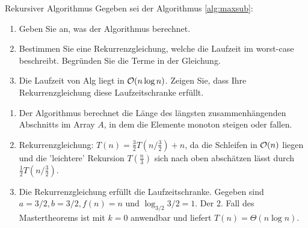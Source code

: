 \documentclass{article}
\begin{document}
\begin{exercise}{Rekursiver Algorithmus}
  Gegeben sei der Algorithmus \ref{alg:maxsub}:
  
  \begin{enumerate}
    \item Geben Sie an, was der Algorithmus berechnet.
    \item Bestimmen Sie eine Rekurrenzgleichung, welche die Laufzeit im worst-case beschreibt. Begründen Sie die Terme in der Gleichung.
    \item Die Laufzeit von Alg liegt in $\mathcal{O}(n \log n)$. Zeigen Sie, dass Ihre Rekurrenzgleichung diese Laufzeitschranke erfüllt.
  \end{enumerate}

  \begin{solution}
    \begin{enumerate}
      \item Der Algorithmus berechnet die Länge des längsten zusammenhängenden Abschnitts im Array $A$, in dem die Elemente monoton steigen oder fallen.
      \item Rekurrenzgleichung: $T(n) = \frac{3}{2}T(n/\frac{3}{2}) + n$, da die Schleifen in $\mathcal{O}(n)$ liegen und die 'leichtere' Rekursion $T(\frac{n}{3})$ sich nach oben abschätzen lässt durch $\frac{1}{2}T(n/\frac{3}{2})$.
      \item Die Rekurrenzgleichung erfüllt die Laufzeitschranke. Gegeben sind $a=3/2, b=3/2, f(n)=n$ und $\log_{3/2}{3/2} = 1$. Der 2. Fall des Mastertheorems ist mit $k=0$ anwendbar und liefert $T(n) = \Theta(n \log n)$.
    \end{enumerate}
  \end{solution}
\end{exercise}
\end{document}
